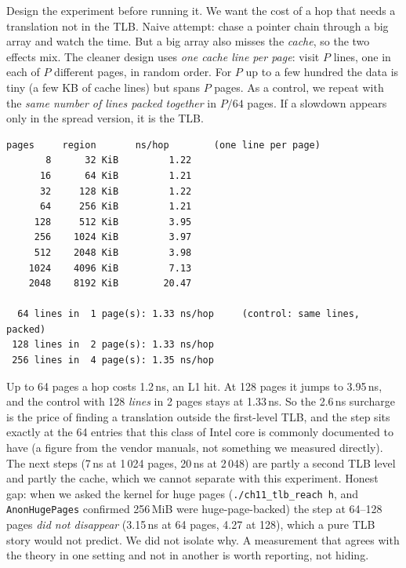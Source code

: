 \begin{example}
Design the experiment before running it. We want the cost of a hop
that needs a translation not in the TLB. Naive attempt: chase a pointer
chain through a big array and watch the time. But a big array also
misses the \emph{cache}, so the two effects mix. The cleaner design uses
\emph{one cache line per page}: visit \(P\) lines, one in each of \(P\)
different pages, in random order. For \(P\) up to a few hundred the data
is tiny (a few KB of cache lines) but spans \(P\) pages. As a control, we
repeat with the \emph{same number of lines packed together} in
\(P/64\) pages. If a slowdown appears only in the spread version, it
is the TLB.

\begin{lstlisting}[language={},label={lst:tlb11},caption={Linux x86\_64 container. Upper block: \texttt{./ch11\_tlb\_reach n} (normal pages, one line per page; rows 8 to 2\,048 pages of the 14 printed). Lower block: the control \texttt{./ch11\_tlb\_control}, the same number of lines packed into few pages (first three rows). Captured in \texttt{code/ch11\_tlb\_linux.txt} and \texttt{code/ch11\_tlb\_control\_linux.txt}.}]
   pages     region       ns/hop        (one line per page)
       8      32 KiB         1.22
      16      64 KiB         1.21
      32     128 KiB         1.22
      64     256 KiB         1.21
     128     512 KiB         3.95
     256    1024 KiB         3.97
     512    2048 KiB         3.98
    1024    4096 KiB         7.13
    2048    8192 KiB        20.47

  64 lines in  1 page(s): 1.33 ns/hop     (control: same lines, packed)
 128 lines in  2 page(s): 1.33 ns/hop
 256 lines in  4 page(s): 1.35 ns/hop
\end{lstlisting}

Up to 64 pages a hop costs 1.2\,ns, an L1 hit. At 128 pages it jumps to
3.95\,ns, and the control with 128 \emph{lines} in 2 pages stays at
1.33\,ns. So the 2.6\,ns surcharge is the price of finding a translation
outside the first-level TLB, and the step sits exactly at the 64
entries that this class of Intel core is commonly documented to have (a figure
from the vendor manuals, not something we measured directly). The
next steps (7\,ns at 1\,024 pages, 20\,ns at 2\,048) are partly a second
TLB level and partly the cache, which we cannot separate with this
experiment. Honest gap: when we asked the kernel for huge pages
(\texttt{./ch11\_tlb\_reach h}, and \texttt{AnonHugePages} confirmed
256\,MiB were huge-page-backed) the step at 64--128 pages \emph{did not
disappear} (3.15\,ns at 64 pages, 4.27 at 128), which a pure TLB
story would not predict. We did not isolate why. A measurement that
agrees with the theory in one setting and not in another is worth
reporting, not hiding.
\end{example}

